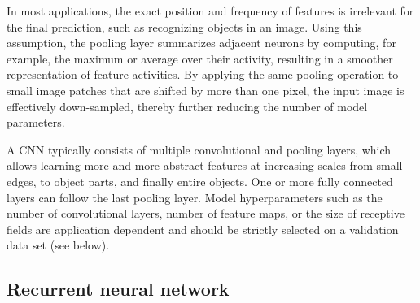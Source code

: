In most applications, the exact position and frequency of features is irrelevant for the final prediction, such as recognizing objects in an image. Using this assumption, the pooling layer summarizes adjacent neurons by computing, for example, the maximum or average over their activity, resulting in a smoother representation of feature activities. By applying the same pooling operation to small image patches that are shifted by more than one pixel, the input image is effectively down-sampled, thereby further reducing the number of model parameters.

A CNN typically consists of multiple convolutional and pooling layers, which allows learning more and more abstract features at increasing scales from small edges, to object parts, and finally entire objects. One or more fully connected layers can follow the last pooling layer. Model hyperparameters such as the number of convolutional layers, number of feature maps, or the size of receptive fields are application dependent and should be strictly selected on a validation data set (see below).


\subsection{Recurrent neural network} \label{sec:dl_rnn}

